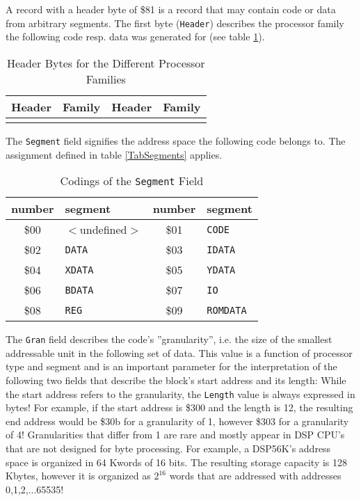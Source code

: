 \documentclass[12pt,twoside]{report}
\newcommand{\tty}[1]{{\tt #1}}
\begin{document}
A record with a header byte of \$81 is a record that may contain code
or data from arbitrary segments.  The first byte (\tty{Header}) describes
the processor family the following code resp. data was generated for (see
table \ref{TabHeader}).

\begin{center}\begin{longtable}{|c|l||c|l|}
\hline
Header  & Family & Header  & Family \\
\hline
\hline
\endhead

\caption{Header Bytes for the Different Processor Families}
\label{TabHeader}
\end{longtable}\end{center}

The \tty{Segment} field signifies the address space the following code
belongs to.  The assignment defined in table \ref{TabSegments} applies.
\begin{table*}[htbp]
\begin{center}\begin{tabular}{|c|l||c|l|}
\hline
number  & segment               & number  & segment \\
\hline
\hline
\$00    & $<$undefined$>$       & \$01    & \tty{CODE} \\
\$02    & \tty{DATA}            & \$03    & \tty{IDATA} \\
\$04    & \tty{XDATA}           & \$05    & \tty{YDATA} \\
\$06    & \tty{BDATA}           & \$07    & \tty{IO} \\
\$08    & \tty{REG}             & \$09    & \tty{ROMDATA} \\
\hline
\end{tabular}\end{center}
\caption{Codings of the {\tt Segment} Field\label{TabSegments}
         \label{TabSegmentNums}}
\end{table*}
The \tty{Gran} field describes the code's ''granularity'', i.e. the size of
the smallest addressable unit in the following set of data.  This
value is a function of processor type and segment and is an important
parameter for the interpretation of the following two fields that
describe the block's start address and its length: While the start
address refers to the granularity, the \tty{Length} value is always
expressed in bytes!  For example, if the start address is \$300 and
the length is 12, the resulting end address would be \$30b for a
granularity of 1, however \$303 for a granularity of 4!  Granularities
that differ from 1 are rare and mostly appear in DSP CPU's that are
not designed for byte processing.  For example, a DSP56K's address
space is organized in 64 Kwords of 16 bits.  The resulting storage
capacity is 128 Kbytes, however it is organized as $2^{16}$ words that
are addressed with addresses 0,1,2,...65535!
\end{document}
